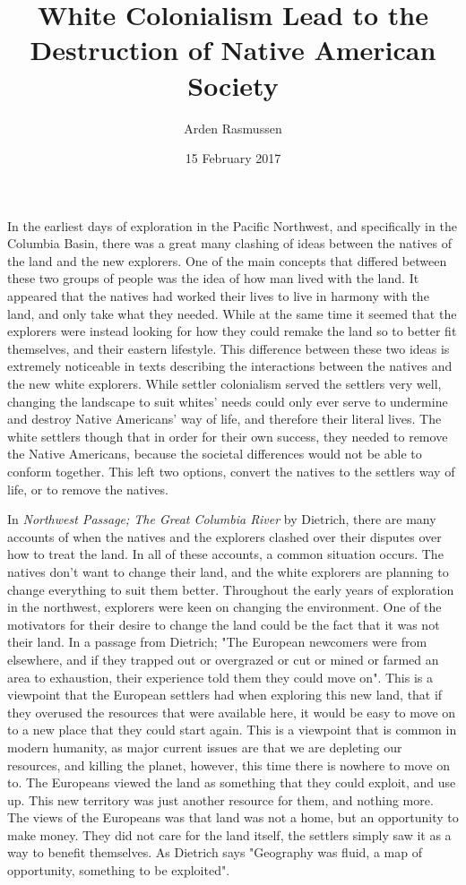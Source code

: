 \documentclass{article}
\title{White Colonialism Lead to the Destruction of Native American Society}
\date{15 February 2017}
\author{Arden Rasmussen}
\begin{document}
\maketitle
\newpage
{}

\par
In the earliest days of exploration in the Pacific Northwest, and specifically in the Columbia Basin, there was a great many clashing of ideas between the natives of the land and the new explorers. One of the main concepts that differed between these two groups of people was the idea of how man lived with the land. It appeared that the natives had worked their lives to live in harmony with the land, and only take what they needed. While at the same time it seemed that the explorers were instead looking for how they could remake the land so to better fit themselves, and their eastern lifestyle. This difference between these two ideas is extremely noticeable in texts describing the interactions between the natives and the new white explorers. While settler colonialism served the settlers very well, changing the landscape to suit whites' needs could only ever serve to undermine and destroy Native Americans' way of life, and therefore their literal lives. The white settlers though that in order for their own success, they needed to remove the Native Americans, because the societal differences would not be able to conform together. This left two options, convert the natives to the settlers way of life, or to remove the natives.
\par
In \textit{Northwest Passage; The Great Columbia River} by Dietrich, there are many accounts of when the natives and the explorers clashed over their disputes over how to treat the land. In all of these accounts, a common situation occurs. The natives don't want to change their land, and the white explorers are planning to change everything to suit them better. Throughout the early years of exploration in the northwest, explorers were keen on changing the environment. One of the motivators for their desire to change the land could be the fact that it was not their land. In a passage from Dietrich; "The European newcomers were from elsewhere, and if they trapped out or overgrazed or cut or mined or farmed an area to exhaustion, their experience told them they could move on"\cite[151]{NWP}. This is a viewpoint that the European settlers had when exploring this new land, that if they overused the resources that were available here, it would be easy to move on to a new place that they could start again. This is a viewpoint that is common in modern humanity, as major current issues are that we are depleting our resources, and killing the planet, however, this time there is nowhere to move on to. The Europeans viewed the land as something that they could exploit, and use up. This new territory was just another resource for them, and nothing more. The views of the Europeans was that land was not a home, but an opportunity to make money. They did not care for the land itself, the settlers simply saw it as a way to benefit themselves. As Dietrich says "Geography was fluid, a map of opportunity, something to be exploited"\cite[151]{NWP}. 
\end{document}
